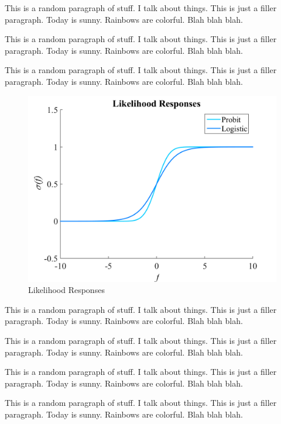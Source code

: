 \documentclass{article}
\begin{document}
		{\color{BurntOrange} This is a random paragraph of stuff. I talk about things. This is just a filler paragraph. Today is sunny. Rainbows are colorful. Blah blah blah.}
		
		{\color{BurntOrange} This is a random paragraph of stuff. I talk about things. This is just a filler paragraph. Today is sunny. Rainbows are colorful. Blah blah blah.}
		
		{\color{BurntOrange} This is a random paragraph of stuff. I talk about things. This is just a filler paragraph. Today is sunny. Rainbows are colorful. Blah blah blah.}
		
		
		\begin{figure}[!htbp]
			\centering
				\includegraphics[width = \linewidth]{Figures/responses.png}
			\caption{Likelihood Responses}
			\label{Figure:LikelihoodResponses}
		\end{figure}
	
		{\color{BurntOrange} This is a random paragraph of stuff. I talk about things. This is just a filler paragraph. Today is sunny. Rainbows are colorful. Blah blah blah.}
		
		{\color{BurntOrange} This is a random paragraph of stuff. I talk about things. This is just a filler paragraph. Today is sunny. Rainbows are colorful. Blah blah blah.}
		
		{\color{BurntOrange} This is a random paragraph of stuff. I talk about things. This is just a filler paragraph. Today is sunny. Rainbows are colorful. Blah blah blah.}
		
		{\color{BurntOrange} This is a random paragraph of stuff. I talk about things. This is just a filler paragraph. Today is sunny. Rainbows are colorful. Blah blah blah.}
		
\end{document}
